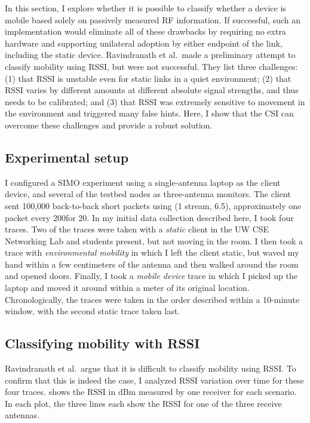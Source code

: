 In this section, I explore whether it is possible to classify whether a device is mobile based solely on passively measured RF information. If successful, such an implementation would eliminate all of these drawbacks by requiring no extra hardware and supporting unilateral adoption by either endpoint of the link, including the static device. Ravindranath et al.\ made a preliminary attempt to classify mobility using RSSI, but were not successful. They list three challenges: (1) that RSSI is unstable even for static links in a quiet environment; (2) that RSSI varies by different amounts at different absolute signal strengths, and thus needs to be calibrated; and (3) that RSSI was extremely sensitive to movement in the environment and triggered many false hints. Here, I show that the CSI can overcome these challenges and provide a robust solution.

\subsection{Experimental setup}
I configured a SIMO experiment using a single-antenna laptop as the client device, and several of the testbed nodes as three-antenna monitors. The client sent 100,000 back-to-back short packets using  (1 stream, 6.5\Mbps), approximately one packet every 200\us for 20\s. In my initial data collection described here, I took four traces. Two of the traces were taken with a \emph{static} client in the UW CSE Networking Lab and students present, but not moving in the room. I then took a trace with \emph{environmental mobility} in which I left the client static, but waved my hand within a few centimeters of the antenna and then walked around the room and opened doors. Finally, I took a \emph{mobile device} trace in which I picked up the laptop and moved it around within a meter of its original location. Chronologically, the traces were taken in the order described within a 10-minute window, with the second static trace taken last. 

\subsection{Classifying mobility with RSSI}
Ravindranath et al.\ argue that it is difficult to classify mobility using RSSI. To confirm that this is indeed the case, I analyzed RSSI variation over time for these four traces.  shows the RSSI in dBm measured by one receiver for each scenario. In each plot, the three lines each show the RSSI for one of the three receive antennas.

